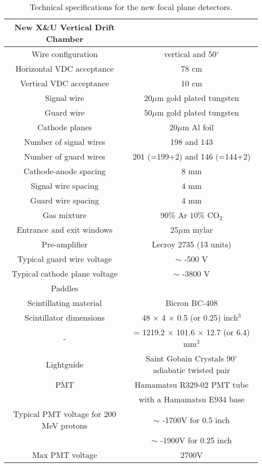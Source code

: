 \documentclass[11pt]{report}
\begin{document}
\begin{table}[!ht]
\centering
\begin{tabular}{c|c}
\hline
\hline
New X\&U Vertical Drift Chamber & \\
\hline
Wire configuration & vertical and 50$^{\circ}$\\
Horizontal VDC acceptance & 78 cm\\
Vertical VDC acceptance & 10 cm\\
Signal wire &  20$\mu$m gold plated tungsten\\
Guard wire &  50$\mu$m gold plated tungsten\\
Cathode planes &  20$\mu$m Al foil\\
Number of signal wires & 198 and 143\\
Number of guard wires & 201 (=199+2) and 146 (=144+2)\\
Cathode-anode spacing & 8 mm\\
Signal wire spacing & 4 mm\\
Guard wire spacing & 4 mm\\
Gas mixture & 90\% Ar 10\% CO$_2$\\
Entrance and exit windows & 25$\mu$m mylar\\
Pre-amplifier & Lecroy 2735 (13 units)\\
Typical guard wire voltage & $\sim$ -500 V\\
Typical cathode plane voltage & $\sim$ -3800 V\\
\hline
\hline
Paddles & \\
\hline
Scintillating material & Bicron BC-408\\
Scintillator dimensions & 48 $\times$ 4 $\times$ 0.5 (or 0.25) inch$^3$\\
     -     & = 1219.2 $\times$ 101.6 $\times$ 12.7 (or 6.4) mm$^3$ \\
Lightguide & Saint Gobain Crystals 90$^{\circ}$ adiabatic twisted pair\\
PMT & Hamamatsu R329-02 PMT tube \\
& with a Hamamatsu E934 base\\
Typical PMT voltage for 200 MeV protons &  $\sim$ -1700V for 0.5 inch\\
&  $\sim$ -1900V for 0.25 inch\\
Max PMT voltage & 2700V \\
\hline
\hline
\end{tabular}
\caption{Technical specifications for the new focal plane detectors.}
\label{table:fpdet-specs-new}
\end{table}
\end{document}
